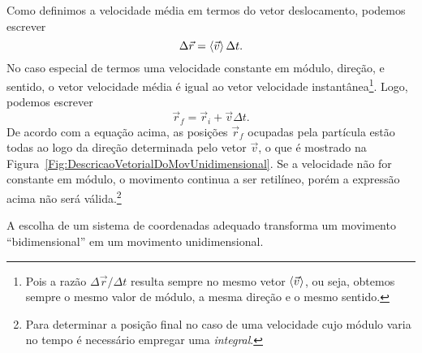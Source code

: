 Como definimos a velocidade média em termos do vetor deslocamento, podemos escrever
\begin{equation}
	\Delta \vec{r} = \left\langle{\vec{v}}\right\rangle \Delta t.
\end{equation}
%
No caso especial de termos uma velocidade constante em módulo, direção, e sentido, o vetor velocidade média é igual ao vetor velocidade instantânea\footnote{Pois a razão $\Delta\vec{r}/\Delta t$ resulta sempre no mesmo vetor $\left\langle{\vec{v}}\right\rangle$, ou seja, obtemos sempre o mesmo valor de módulo, a mesma direção e o mesmo sentido.}. Logo, podemos escrever
\begin{equation}
	\vec{r}_f = \vec{r}_i + \vec{v} \Delta t.
\end{equation}
%
De acordo com a equação acima, as posições $\vec{r}_f$ ocupadas pela partícula estão todas ao logo da direção determinada pelo vetor $\vec{v}$, o que é mostrado na Figura~\ref{Fig:DescricaoVetorialDoMovUnidimensional}. Se a velocidade não for constante em módulo, o movimento continua a ser retilíneo, porém a expressão acima não será válida.\footnote{Para determinar a posição final no caso de uma velocidade cujo módulo varia no tempo é necessário empregar uma \emph{integral}.}

\begin{marginfigure}[2cm]
\centering
{}
\caption{A escolha de um sistema de coordenadas adequado transforma um movimento ``bidimensional'' em um movimento unidimensional.}
\end{marginfigure}

